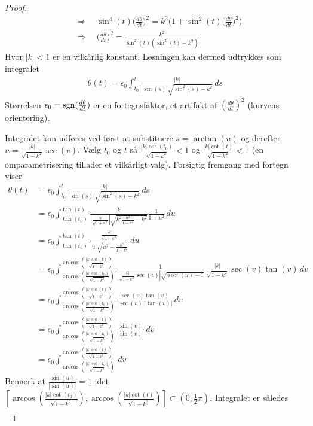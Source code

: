 \begin{proof}
\begin{align*}
&\Rightarrow \quad
\sin^4(t)\big(\frac{d\theta}{dt} \big)^2 = k^2 \Big( 1+\sin^2(t) \big(\frac{d\theta}{dt} \big)^2 \Big) \\
&\Rightarrow \quad
\big(\frac{d\theta}{dt} \big)^2 = \frac{k^2}{\sin^2(t)(\sin^2(t)-k^2)}
\end{align*}
Hvor $|k|<1$ er en vilkårlig konstant. Løsningen kan dermed udtrykkes som integralet
\begin{align*}
\theta(t) = \epsilon_0 \int_{t_0}^t \frac{|k|}{|\sin(s)|\sqrt{\sin^2(s)-k^2}} \, ds
\end{align*}
Størrelsen $\epsilon_0 = \textnormal{sgn}(\frac{d\theta}{dt}) $ er en fortegnsfaktor, et artifakt af $(\frac{d\theta}{dt})^2$ (kurvens orientering).


\newpage
\noindent Integralet kan udføres ved først at substituere $s=\arctan(u)$ og derefter $u=\frac{|k|}{\sqrt{1-k^2}}\sec(v)$. Vælg $t_0$ og $t$ så $\frac{|k|\cot(t_0)}{\sqrt{1-k^2}}<1$ og $\frac{|k|\cot(t)}{\sqrt{1-k^2}}<1$ (en omparametrisering tillader et vilkårligt valg). Forsigtig fremgang med fortegn viser
\begin{align*}
\theta(t) &= \epsilon_0 \int_{t_0}^t \frac{|k|}{|\sin(s)|\sqrt{\sin^2(s)-k^2}} \, ds \\
&=
\epsilon_0 \int^{\tan(t)}_{\tan(t_0)} \frac{|k|}{|\frac{u}{\sqrt{1+u^2}}|\sqrt{k^2 \frac{u^2}{1+u^2}-k^2}} \frac{1}{1+u^2}\, du \\
&=
\epsilon_0 \int^{\tan(t)}_{\tan(t_0)} \frac{\frac{|k|}{\sqrt{1-k^2}}}{|u|\sqrt{u^2 -\frac{k^2}{1-k^2}}}\, du \\
&=
\epsilon_0 \int^{\arccos(\frac{|k|\cot(t)}{\sqrt{1-k^2}})}_{\arccos(\frac{|k|\cot(t_0)}{\sqrt{1-k^2}})} \frac{1}{|\frac{|k|}{\sqrt{1-k^2}}\sec(v)|\sqrt{\sec^2(u) - 1}}\, \frac{|k|}{\sqrt{1-k^2}}\sec(v)\tan(v)\, dv \\
&=
\epsilon_0 \int^{\arccos(\frac{|k|\cot(t)}{\sqrt{1-k^2}})}_{\arccos(\frac{|k|\cot(t_0)}{\sqrt{1-k^2}})} \frac{\sec(v)\tan(v)}{|\sec(v)||\tan(v)|} \, dv \\
&=
\epsilon_0 \int^{\arccos(\frac{|k|\cot(t)}{\sqrt{1-k^2}})}_{\arccos(\frac{|k|\cot(t_0)}{\sqrt{1-k^2}})} \frac{\sin(v)}{|\sin(v)|} \, dv \\
&=
\epsilon_0 \int^{\arccos(\frac{|k|\cot(t)}{\sqrt{1-k^2}})}_{\arccos(\frac{|k|\cot(t_0)}{\sqrt{1-k^2}})} \, dv
\end{align*}
Bemærk at $\frac{\sin(u)}{|\sin(u)|}=1$ idet $[\arccos(\frac{|k|\cot(t_0)}{\sqrt{1-k^2}}),\arccos(\frac{|k|\cot(t)}{\sqrt{1-k^2}})] \subset (0,\frac{1}{2}\pi)$. Integralet er således
\begin{align*}

\end{align*}
\end{proof}
